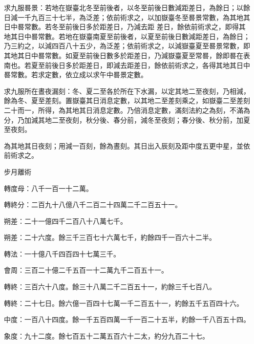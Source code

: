 \begin{pinyinscope}
 求九服晷景：若地在嶽臺北冬至前後者，以冬至前後日數減距差日，為餘日；以餘日減一千九百三十七半，為泛差；依前術求之，以加嶽臺冬至晷景常數，為其地其日中晷常數。若冬至前後日多於距差日，乃減去距
 差日，餘依前術求之，即得其地其日中晷常數。若地在嶽臺南夏至前後者，以夏至前後日數減距差日，為餘日；乃三約之，以減四百八十五少，為泛差；依前術求之，以減嶽臺夏至晷景常數，即其地其日中晷常數。如夏至前後日數多於距差日，乃減嶽臺夏至常晷，餘即晷在表南也。若夏至前後日多於距差日，即減去距差日，餘依前術求之，各得其地其日中晷常數。若求定數，依立成以求午中晷景定數。



 求九服所在晝夜漏刻：冬、夏二至各於所在下水漏，以定其地二至夜刻，乃相減，餘為冬、夏至差刻。置嶽臺其日消息定數，以其地二至差刻乘之，如嶽臺二至差刻二十而一，所得，為其地其日消息定數。乃倍消息定數，滿刻法約之為刻，不滿為分，乃加減其地二至夜刻，秋分後、春分前，減冬至夜刻；春分後、秋分前，加夏至夜刻。



 為其地其日夜刻；用減一百刻，餘為晝刻。其日出入辰刻及距中度五更中星，並依前術求之。



 步月離術



 轉度母：八千一百一十二萬。



 轉終分：二百九十八億八千二百二十四萬二千二百五十一。



 朔差：二十一億四千二百八十八萬七千。



 朔差：二十六度。餘三千三百七十六萬七千，約餘四千一百六十二半。



 轉法：一十億八千四百四十七萬三千。



 會周：三百二十億二千五百一十二萬九千二百五十一。



 轉終：三百六十八度。餘三十八萬二千二百五十一，約餘三千七百八。



 轉終：二十七日。餘六億一百四十七萬一千二百五十一，約餘五千五百四十六。



 中度：一百八十四度。餘一千五百四萬一千一百二十五半，約餘一千八百五十四。



 象度：九十二度。餘七百五十二萬五百六十二太，約分九百二十七。




\end{pinyinscope}
